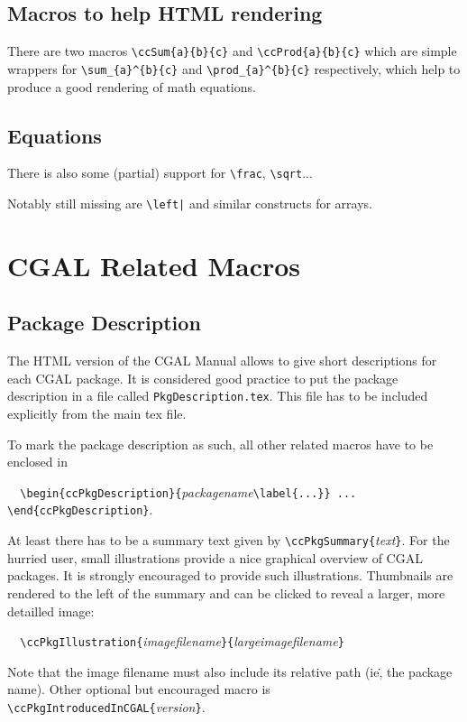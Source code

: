 \documentclass[11pt]{article}
\begin{document}
\subsection{Macros to help HTML rendering}
There are two macros \verb+\ccSum{a}{b}{c}+ and \verb+\ccProd{a}{b}{c}+
which are simple wrappers for \verb+\sum_{a}^{b}{c}+ and \verb+\prod_{a}^{b}{c}+
respectively, which help to produce a good rendering of math equations.

\subsection{Equations}

There is also some (partial) support for \verb+\frac+, \verb+\sqrt+...

Notably still missing are \verb+\left|+ and similar constructs for arrays.


\section{CGAL Related Macros}
\subsection{Package Description}
The HTML version of the CGAL Manual allows to give short descriptions for
each CGAL package. It is considered good practice to put the package
description in a file called \verb+PkgDescription.tex+. This file has to be
included explicitly from the main tex file.

To mark the package description as such, all other related macros have to be
enclosed in

\verb+  \begin{ccPkgDescription}{+{\em packagename}\verb+\label{...}} ... \end{ccPkgDescription}+.



At least there has to be a summary text given by
\verb+\ccPkgSummary{+{\em text}\verb+}+. For the hurried user, small
illustrations provide a nice graphical overview of
CGAL packages. It is strongly encouraged to provide such illustrations.
Thumbnails are rendered to the left of the summary and can be clicked to
reveal a larger, more detailled image:

\verb+  \ccPkgIllustration{+{\em imagefilename}\verb+}{+{\em largeimagefilename}\verb+}+

Note that the image filename must also include its relative path
(ie\., the package name). Other optional but encouraged macro is
\verb+\ccPkgIntroducedInCGAL{+{\em version}\verb+}+.
\end{document}
